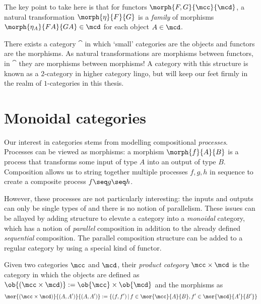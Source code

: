 The key point to take here is that for functors \(\morph{F,G}{\mcc}{\mcd}\), a
natural transformation \(\morph{\eta}{F}{G}\) is a \emph{family} of morphisms
\(\morph{\eta_A}{FA}{GA} \in \mcd\) for each object \(A \in \mcd\).

\begin{remark}
    There exists a category \(\cat\) in which `small' categories are the objects
    and functors are the morphisms.
    As natural transformations are morphisms between functors, in \(\cat\) they
    are morphisms between morphisms!
    A category with this structure is known as a \(2\)-category in higher
    category lingo, but will keep our feet firmly in the realm of
    \(1\)-categories in this thesis.
\end{remark}

\section{Monoidal categories}

Our interest in categories stems from modelling compositional \emph{processes}.
Processes can be viewed as morphisms: a morphism \(\morph{f}{A}{B}\) is a
process that transforms some input of type \(A\) into an output of type \(B\).
Composition allows us to string together multiple processes \(f, g, h\) in
sequence to create a composite process \(f \seq g \seq h\).

However, these processes are not particularly interesting: the inputs and
outputs can only be single types of and there is no notion of parallelism.
These issues can be allayed by adding structure to elevate a category into a
\emph{monoidal} category, which has a notion of \emph{parallel} composition in
addition to the already defined \emph{sequential} composition.
The parallel composition structure can be added to a regular category by using
a special kind of functor.

\begin{definition}
    Given two categories \(\mcc\) and \(\mcd\), their \emph{product category}
    \(\mcc \times \mcd\) is the category in which the objects are defined as \(
        \ob{(\mcc \times \mcd)} := \ob{\mcc} \times \ob{\mcd}
    \) and the morphisms as \[
        \mor{(\mcc \times \mcd)}{(A, A^\prime)}{(A, A^\prime)}
        :=
        \{
            (f, f^\prime)
            \,|\,
            f \in \mor{\mcc}{A}{B},
            f^\prime \in \mor{\mcd}{A^\prime}{B^\prime}
        \}
    \]
\end{definition}

